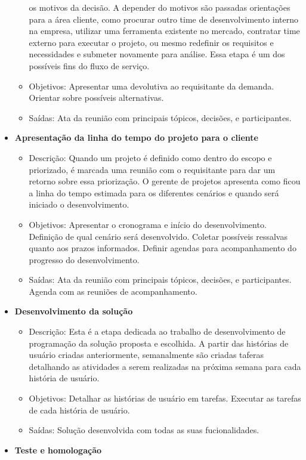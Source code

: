 \begin{itemize}
\begin{itemize}
			os motivos da decisão. A depender do motivos são passadas orientações para a área cliente, como procurar outro time de desenvolvimento interno na empresa,
			utilizar uma ferramenta existente no mercado, contratar time externo para executar o projeto, ou mesmo redefinir os requisitos e necessidades e submeter novamente para análise.
			Essa etapa é um dos possíveis fins do fluxo de serviço.
			\item Objetivos: Apresentar uma devolutiva ao requisitante da demanda. Orientar sobre possíveis alternativas.
			\item Saídas: Ata da reunião com principais tópicos, decisões, e participantes.
		\end{itemize}
		\item \textbf{Apresentação da linha do tempo do projeto para o cliente}
		\begin{itemize}
			\item Descrição: Quando um projeto é definido como dentro do escopo e priorizado, é marcada uma reunião com o requisitante
			para dar um retorno sobre essa priorização. O gerente de projetos apresenta como ficou a linha do tempo estimada para os diferentes cenários e quando será
			iniciado o desenvolvimento.
			\item Objetivos: Apresentar o cronograma e início do desenvolvimento. Definição de qual cenário será desenvolvido. Coletar possíveis ressalvas quanto aos prazos informados.
			Definir agendas para acompanhamento do progresso do desenvolvimento.
			\item Saídas: Ata da reunião com principais tópicos, decisões, e participantes. Agenda com as reuniões de acompanhamento.
		\end{itemize}
		\item \textbf{Desenvolvimento da solução}
		\begin{itemize}
			\item Descrição: Esta é a etapa dedicada ao trabalho de desenvolvimento de programação da solução proposta e escolhida. A partir das histórias de usuário
			criadas anteriormente, semanalmente são criadas taferas detalhando as atividades a serem realizadas na próxima semana para cada história de usuário.
			\item Objetivos: Detalhar as histórias de usuário em tarefas. Executar as tarefas de cada história de usuário.
			\item Saídas: Solução desenvolvida com todas as suas fucionalidades.
		\end{itemize}
		\item \textbf{Teste e homologação}

\end{itemize}

